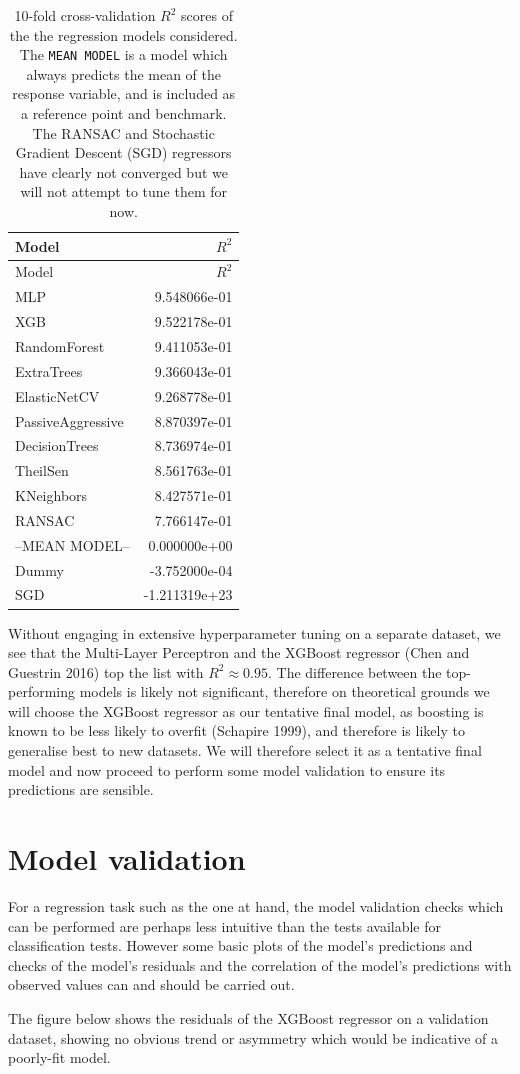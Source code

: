 \documentclass[]{article}
\begin{document}
\begin{longtable}[]{@{}lr@{}}
\caption{10-fold cross-validation \(R^2\) scores of the the regression
models considered. The \texttt{MEAN\ MODEL} is a model which always
predicts the mean of the response variable, and is included as a
reference point and benchmark. The RANSAC and Stochastic Gradient
Descent (SGD) regressors have clearly not converged but we will not
attempt to tune them for now.}\tabularnewline
\toprule
Model & \(R^2\)\tabularnewline
\midrule
\endfirsthead
\toprule
Model & \(R^2\)\tabularnewline
\midrule
\endhead
MLP & 9.548066e-01\tabularnewline
XGB & 9.522178e-01\tabularnewline
RandomForest & 9.411053e-01\tabularnewline
ExtraTrees & 9.366043e-01\tabularnewline
ElasticNetCV & 9.268778e-01\tabularnewline
PassiveAggressive & 8.870397e-01\tabularnewline
DecisionTrees & 8.736974e-01\tabularnewline
TheilSen & 8.561763e-01\tabularnewline
KNeighbors & 8.427571e-01\tabularnewline
RANSAC & 7.766147e-01\tabularnewline
--MEAN MODEL-- & 0.000000e+00\tabularnewline
Dummy & -3.752000e-04\tabularnewline
SGD & -1.211319e+23\tabularnewline
\bottomrule
\end{longtable}

Without engaging in extensive hyperparameter tuning on a separate
dataset, we see that the Multi-Layer Perceptron and the XGBoost
regressor (Chen and Guestrin 2016) top the list with
\(R^2 \approx 0.95\). The difference between the top-performing models
is likely not significant, therefore on theoretical grounds we will
choose the XGBoost regressor as our tentative final model, as boosting
is known to be less likely to overfit (Schapire 1999), and therefore is
likely to generalise best to new datasets. We will therefore select it
as a tentative final model and now proceed to perform some model
validation to ensure its predictions are sensible.

\section{Model validation}\label{model-validation}

For a regression task such as the one at hand, the model validation
checks which can be performed are perhaps less intuitive than the tests
available for classification tests. However some basic plots of the
model's predictions and checks of the model's residuals and the
correlation of the model's predictions with observed values can and
should be carried out.

The figure below shows the residuals of the XGBoost regressor on a
validation dataset, showing no obvious trend or asymmetry which would be
indicative of a poorly-fit model.
\end{document}
